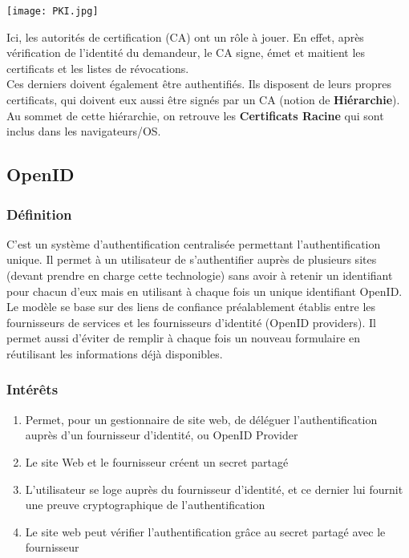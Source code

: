 \documentclass{report}
\begin{document}
\texttt{[image: PKI.jpg]}

Ici, les autorités de certification (CA) ont un rôle à jouer. En effet, après vérification de l'identité du demandeur, le CA signe, émet et maitient les certificats et les listes de révocations.\\ Ces derniers doivent également être authentifiés. Ils disposent de leurs propres certificats, qui doivent eux aussi être signés par un CA (notion de \textbf{Hiérarchie}). Au sommet de cette hiérarchie, on retrouve les \textbf{Certificats Racine} qui sont inclus dans les navigateurs/OS.

\subsection{OpenID}

\subsubsection{Définition}
C'est un système d'authentification centralisée permettant l'authentification unique. Il permet à un utilisateur de s’authentifier auprès de plusieurs sites (devant prendre en charge cette technologie) sans avoir à retenir un identifiant pour chacun d’eux mais en utilisant à chaque fois un unique identifiant OpenID. Le modèle se base sur des liens de confiance préalablement établis entre les fournisseurs de services et les fournisseurs d’identité (OpenID providers). Il permet aussi d’éviter de remplir à chaque fois un nouveau formulaire en réutilisant les informations déjà disponibles.

\subsubsection{Intérêts}

\begin{enumerate}
    \item Permet, pour un gestionnaire de site web, de déléguer
l’authentification auprès d’un fournisseur d’identité, ou OpenID
Provider
    \item Le site Web et le fournisseur créent un secret partagé
    \item L’utilisateur se loge auprès du fournisseur d’identité, et ce dernier lui fournit une preuve cryptographique de l’authentification
    \item Le site web peut vérifier l’authentification grâce au secret partagé
avec le fournisseur
\end{enumerate}
\end{document}
